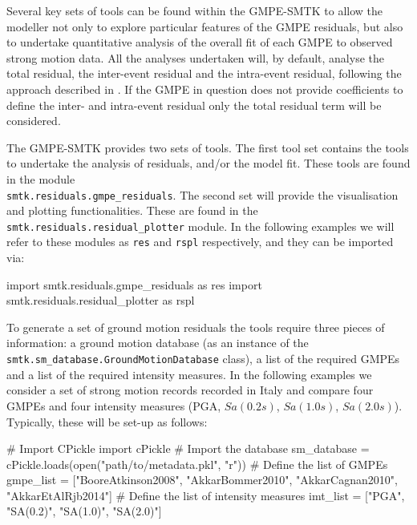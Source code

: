 Several key sets of tools can be found within the GMPE-SMTK to allow the modeller not only to explore particular features of the GMPE residuals, but also to undertake quantitative analysis of the overall fit of each GMPE to observed strong motion data. All the analyses undertaken will, by default, analyse the total residual, the inter-event residual and the intra-event residual, following the approach described in \textcite{Stafford_etal2008}. If the GMPE in question does not provide coefficients to define the inter- and intra-event residual only the total residual term will be considered.

The GMPE-SMTK provides two sets of tools. The first tool set contains the tools to undertake the analysis of residuals, and/or the model fit. These tools are found in the module \\ \verb=smtk.residuals.gmpe_residuals=. The second set will provide the visualisation and plotting functionalities. These are found in the \verb=smtk.residuals.residual_plotter= module. In the following examples we will refer to these modules as \verb=res= and \verb=rspl= respectively, and they can be imported via:

\begin{python}[frame=single]
import smtk.residuals.gmpe_residuals as res
import smtk.residuals.residual_plotter as rspl
\end{python}

To generate a set of ground motion residuals the tools require three pieces of information: a ground motion database (as an instance of the \verb=smtk.sm_database.GroundMotionDatabase= class), a list of the required GMPEs and a list of the required intensity measures. In the following examples we consider a set of strong motion records recorded in Italy and compare four GMPEs \parencite{boore2008, AkkarBommer2010, AkkarCagnan2010, Akkar_etal2014} and four intensity measures (PGA, $Sa \left( {0.2 s} \right)$, $Sa \left( {1.0 s} \right)$, $Sa \left( {2.0 s} \right)$). Typically, these will be set-up as follows:

\begin{python}[frame=single]
# Import CPickle
import cPickle
# Import the database
sm_database = cPickle.loads(open("path/to/metadata.pkl", "r"))
# Define the list of GMPEs
gmpe_list = ["BooreAtkinson2008",
             "AkkarBommer2010",
             "AkkarCagnan2010",
             "AkkarEtAlRjb2014"]
# Define the list of intensity measures
imt_list = ["PGA", "SA(0.2)", "SA(1.0)", "SA(2.0)"] 
\end{python}

